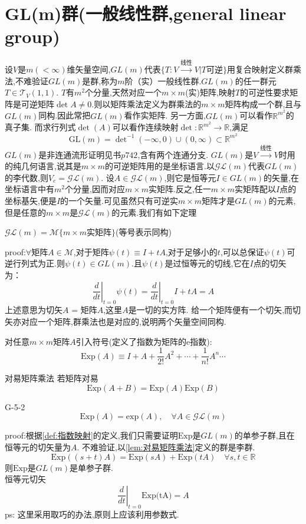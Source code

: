 \documentclass[../main.tex]{subfiles}
\begin{document}
 \section{GL(m)群(一般线性群,general linear group)}
 设$V$是$m(<\infty)$维矢量空间,$GL(m)$代表$\{T:V\xrightarrow{\text{线性}}V|T\text{可逆}\}$用复合映射定义群乘法,不难验证$GL(m)$是群,称为$m$阶（实）一般线性群.$GL(m)$的任一群元$T\in\mathscr{T}_V(1,1)$.
 $T$有$m^2$个分量,天然对应一个$m\times m$(实)矩阵,映射$T$的可逆性要求矩阵是可逆矩阵$\det{A}\ne 0$.则以矩阵乘法定义为群乘法的$m\times m$矩阵构成一个群,且与$GL(m)$同构.因此常把$GL(m)$看作实矩阵.
 另一方面,$GL(m)$可以看作$\mathbb{R}^{m^2}$的真子集.
 而求行列式$\det(A)$可以看作连续映射$\det:\mathbb{R}^{m^2}\rightarrow \mathbb{R}$,满足
     $$ \text{GL}(m) = \det\nolimits^{-1}(-\infty,0)\cup(0,\infty) \subset \mathbb{R}^{m^2} $$
 $GL(m)$是非连通流形证明见书$p742$,含有两个连通分支.
  $GL(m)$是$V\xrightarrow{\text{线性}}V$时用的纯几何语言,说其是$m\times m$的可逆矩阵用的是坐标语言.以$\mathscr{GL}(m)$代表$GL(m)$的李代数,则$V_e = \mathscr{GL}(m)$.
 设$A\in \mathscr{GL}{(m)}$,则它是恒等元$I \in GL(m)$的矢量,在坐标语言中有$m^2$个分量,因而对应$m\times m$实矩阵.反之,任一$m\times m$实矩阵配以$I$点的坐标基矢,便是$I$的一个矢量.可见虽然只有可逆实$m\times m$矩阵才是$GL(m)$的元素,但是任意的$m\times m$是$\mathscr{GL}(m)$的元素.我们有如下定理
 \begin{theorem}
     $\mathscr{GL}(m) = \mathscr{M}\{m\times m \text{实矩阵}\}$(等号表示同构)
 \end{theorem}
    proof:$\forall$矩阵$A\in \mathscr{M}$,对于矩阵$\psi(t)\equiv I + tA$,对于足够小的$t$,可以总保证$\psi(t)$可逆行列式为正.则$\psi(t) \in GL(m)$.且$\psi(t)$是过恒等元的切线,它在$I$点的切矢为：
 $$
 \left.\frac{d}{dt}\right|_{t=0}\psi(t) = \left.\frac{d}{dt}\right|_{t=0}I + tA = A
 $$
 上述意思为切矢$A$ = 矩阵$A$,这里$A$是一切的实方阵.
 给一个矩阵便有一个切矢,而切矢亦对应一个矩阵,群乘法也是对应的,说明两个矢量空间同构.

 对任意$m\times m$矩阵$A$引入符号(定义了指数为矩阵的e指数):
     $$ \text{Exp}(A)\equiv I + A + \frac{1}{2!}A^2 +\cdots+\frac{1}{n!}A^n\cdots $$
 \begin{lemma}{}{对易矩阵乘法}
    若矩阵对易
     $$ \text{Exp}(A+B)= \text{Exp}(A)\text{Exp}(B) $$
 \end{lemma}
\begin{theorem}{}{G-5-2}
	$$ \text{Exp}(A) = \text{exp}(A),\quad\forall A \in \mathscr{GL}(m) $$
\end{theorem}
 proof:根据\ref{def:指数映射}的定义,我们只需要证明$\text{Exp}$是$GL(m)$的单参子群,且在恒等元的切矢量为$A$.
     不难验证,以\ref{lem:对易矩阵乘法}定义的群是李群.
     $$ \text{Exp}((s+t)A) = \text{Exp}(sA) + \text{Exp}(tA) \quad \forall s,t \in \mathbb{R}$$
     则$\text{Exp}$是$GL(m)$是单参子群.\\
     恒等元切矢
     \begin{equation*}
         \left.\frac{d}{dt}\right|_{t=0}\text{Exp(tA)}= A
     \end{equation*}
     ps: 这里采用取巧的办法,原则上应该利用参数式.
\end{document}
